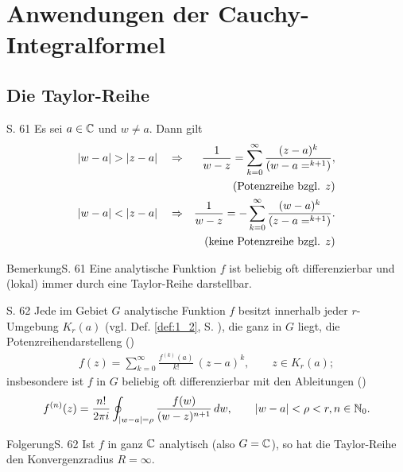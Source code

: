 \section{Anwendungen der Cauchy-Integralformel}



\subsection{Die Taylor-Reihe}

\begin{satz}{S. 61}
  Es sei $a \in \mathbb{C}$ und $w \neq a$.
  Dann gilt
  \begin{align}
    |w - a| > |z - a| \quad & \Rightarrow &\frac{1}{w-z} = \sum_{k=0}^\infty \frac{(z-a)^k}{(w-a=^{k+1})} , \\
    && (\text{Potenzreihe bzgl. } z) \notag \\
    |w - a| < |z - a| \quad & \Rightarrow &\frac{1}{w-z} = - \sum_{k=0}^\infty \frac{(w-a)^k}{(z-a=^{k+1})} . \\
    && (\text{keine Potenzreihe bzgl. } z) \notag
  \end{align}
\end{satz}

\begin{bemerkung}{Bemerkung}{S. 61}
  Eine analytische Funktion $f$ ist beliebig oft differenzierbar und (lokal) immer durch eine Taylor-Reihe darstellbar.
\end{bemerkung}

\begin{satz}{S. 62}
  \label{satz:6_2}
  Jede im Gebiet $G$ analytische Funktion $f$ besitzt innerhalb jeder $r$-Um\-ge\-bung $K_r(a)$ (vgl. Def. \ref{def:1_2}, S. \pageref{def:1_2}), die ganz in $G$ liegt, die Potenzreihendarstelleng ()
  \begin{align}
    f(z) = \sum_{k=0}^\infty \frac{f^{(k)}(a)}{k!} \, (z - a)^k, \qquad z \in K_r(a);
  \end{align}
  insbesondere ist $f$ in $G$ beliebig oft differenzierbar mit den Ableitungen ()
  \begin{align}
    f^{(n)}(z) =  \frac{n!}{2 \pi i} \oint_{|w-a|=\rho} \frac{f(w)}{(w-z)^{n+1}} \, dw, \qquad |w-a| < \rho < r, n \in \mathbb{N}_0 .
  \end{align}
\end{satz}

\begin{bemerkung}{Folgerung}{S. 62}
  Ist $f$ in ganz $\mathbb{C}$ analytisch (also $G = \mathbb{C}$), so hat die Taylor-Reihe den Konvergenzradius $R = \infty$.
\end{bemerkung}

